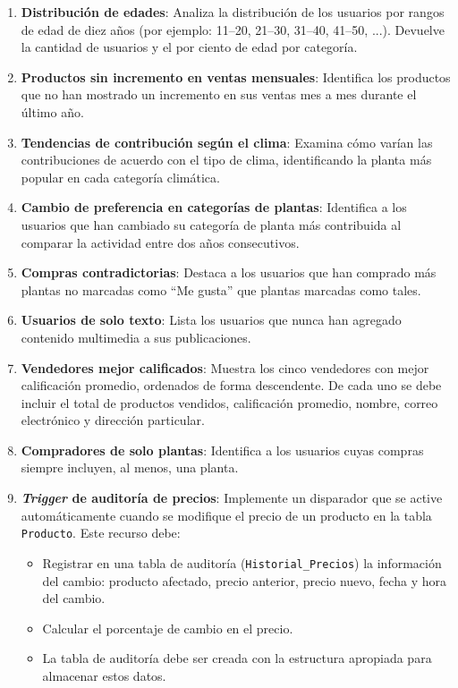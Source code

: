 \documentclass[10pt]{article}
\begin{document}
\begin{enumerate}
\begin{enumerate}
            \item \textbf{Distribución de edades}: Analiza la distribución de los usuarios por rangos de edad de diez años (por ejemplo: 11–20, 21–30, 31–40, 41–50, ...). Devuelve la cantidad de usuarios y el por ciento de edad por categoría.
        
            \item \textbf{Productos sin incremento en ventas mensuales}: Identifica los productos que no han mostrado un incremento en sus ventas mes a mes durante el último año.
        
            \item \textbf{Tendencias de contribución según el clima}: Examina cómo varían las contribuciones de acuerdo con el tipo de clima, identificando la planta más popular en cada categoría climática.
        
            \item \textbf{Cambio de preferencia en categorías de plantas}: Identifica a los usuarios que han cambiado su categoría de planta más contribuida al comparar la actividad entre dos años consecutivos.
        
            \item \textbf{Compras contradictorias}: Destaca a los usuarios que han comprado más plantas no marcadas como “Me gusta” que plantas marcadas como tales.
        
            \item \textbf{Usuarios de solo texto}: Lista los usuarios que nunca han agregado contenido multimedia a sus publicaciones.
        
            \item \textbf{Vendedores mejor calificados}: Muestra los cinco vendedores con mejor calificación promedio, ordenados de forma descendente. De cada uno se debe incluir el total de productos vendidos, calificación promedio, nombre, correo electrónico y dirección particular.
        
             \item \textbf{Compradores de solo plantas}: Identifica a los usuarios cuyas compras siempre incluyen, al menos, una planta.
             
             \item \textbf{\emph{Trigger} de auditoría de precios}: Implemente un disparador que se active automáticamente cuando se modifique el precio de un producto en la tabla \texttt{Producto}. Este recurso debe:
             \begin{itemize}
             	\item Registrar en una tabla de auditoría (\texttt{Historial\_Precios}) la información del cambio: producto afectado, precio anterior, precio nuevo, fecha y hora del cambio.
             	\item Calcular el porcentaje de cambio en el precio.
             	\item La tabla de auditoría debe ser creada con la estructura apropiada para almacenar estos datos.
             \end{itemize}
             

\end{enumerate}
\end{enumerate}
\end{document}
